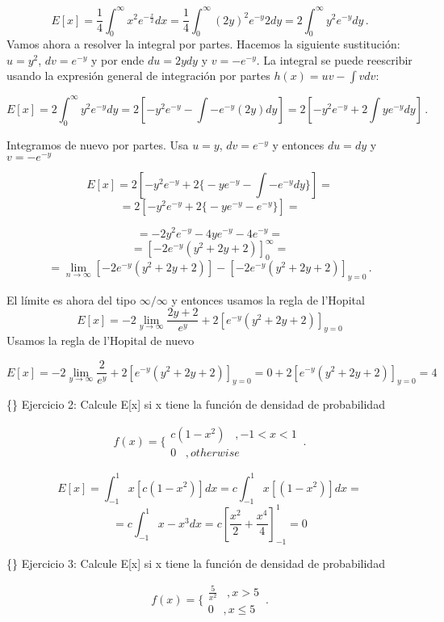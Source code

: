 \documentclass[
]{agujournal2019}
\begin{document}
\[E[x]=\frac{1}{4}\int^\infty_0 x^2e^{-\frac{x}{2}}dx
        =\frac{1}{4}\int^\infty_0 (2y)^2e^{-y}2dy
    =2\int^\infty_0y^2e^{-y}dy\,.\] Vamos ahora a resolver la integral
por partes. Hacemos la siguiente sustitución: \(u=y^2\), \(dv=e^{-y}\) y
por ende \(du=2ydy\) y \(v=-e^{-y}\). La integral se puede reescribir
usando la expresión general de integración por partes
\(h(x)=uv-\int vdv\):

\[E[x]=2\int^\infty_0y^2e^{-y}dy=2\left[ -y^2e^{-y}-\int-e^{-y}(2y)dy\right]
      =2\left[ -y^2e^{-y}+2\int ye^{-y}dy\right]\,.\]

Integramos de nuevo por partes. Usa \(u=y\), \(dv=e^{-y}\) y entonces
\(du=dy\) y \(v=-e^{-y}\)

\[E[x]=2\left[ -y^2 e^{-y} + 2 \Big\{ -y e^{-y} - \int -e^{-y}dy \Big\} \right]=\]
\[=2\left[ -y^2 e^{-y} + 2 \Big\{ -y e^{-y} - e^{-y}         \Big\} \right]=\]

\[=-2y^2e^{-y}-4ye^{-y}-4e^{-y}=\]
\[=\left[ -2e^{-y}(y^2+2y+2) \right]^{\infty}_0=\]
\[=\lim_{n \to\infty}\left[ -2e^{-y}(y^2+2y+2) \right]-\left[ -2e^{-y}(y^2+2y+2) \right]_{y=0}\,.\]

El límite es ahora del tipo \(\infty/\infty\) y entonces usamos la regla
de l'Hopital
\[E[x]=-2\lim_{y \to\infty}\frac{2y+2}{e^y}+2\left[e^{-y}(y^2+2y+2) \right]_{y=0}\]
Usamos la regla de l'Hopital de nuevo

\[E[x]=-2\lim_{y \to\infty}\frac{2}{e^y}+2\left[e^{-y}(y^2+2y+2) \right]_{y=0}=0+2\left[e^{-y}(y^2+2y+2) \right]_{y=0}=4\]

\vspace{0.5cm}

\{\noindent\} Ejercicio 2: Calcule E{[}x{]} si x tiene la función de
densidad de probabilidad

\[f(x)=\Bigg\{\begin{array}{c}
 c(1-x^2)\,\,\,\,\,,-1<x<1 \\ 0 \,\,\,\,\,,otherwise
       \end{array} \,.\]

\[E[x]=\int^1_{-1} x[c(1-x^2)]dx=c \int^1_{-1} x[(1-x^2)]dx=\]
\[=c \int^1_{-1} x-x^3dx=c\left[\frac{x^2}{2}+\frac{x^4}{4}\right]^{1}_{-1}=0\]

\vspace{0.5cm}

\{\noindent\} Ejercicio 3: Calcule E{[}x{]} si x tiene la función de
densidad de probabilidad

\[f(x)=\Bigg\{\begin{array}{c}
 \frac{5}{x^2}\,\,\,\,\,,x>5 \\ 0 \,\,\,\,\,,x\le5
       \end{array} \,.\]
\end{document}
